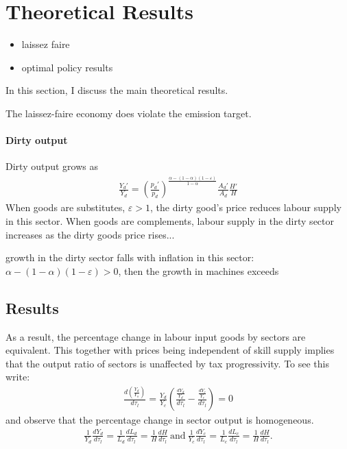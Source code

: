 \section{Theoretical Results}\label{sec:theory}
\begin{itemize}
	\item laissez faire
	\item optimal policy results
\end{itemize}

In this section, I discuss the main theoretical results. 

The laissez-faire economy does violate the emission target. 

\paragraph{Dirty output}

Dirty output grows as
\begin{align*}
	\frac{Y_d'}{Y_d}=\left(\frac{p_d'}{p_d}\right)^{\frac{\alpha-(1-\alpha)(1-\varepsilon)}{1-\alpha}}\frac{A_d'}{A_d}\frac{H'}{H}
\end{align*}
When goods are substitutes, $\varepsilon>1$, the dirty good's price reduces labour supply in this sector. When goods are complements, labour supply in the dirty sector increases as the dirty goods price rises...

growth in the dirty sector falls with inflation in this sector: $\alpha -(1-\alpha)(1-\varepsilon)>0$, then the growth in machines exceeds 
\subsection{Results}
As a result, the percentage change in labour input goods by sectors are equivalent. This together with prices being independent of skill supply implies that the output ratio of sectors is unaffected by tax progressivity.
To see this write:
\begin{align}
	\frac{d\left(\frac{Y_d}{Y_s}\right)}{d \tau_l}=\frac{Y_d}{Y_c}\left(\frac{\frac{dY_d}{Y_d}}{d \tau_l}-\frac{\frac{dY_c}{Y_c}}{d \tau_l}\right)=0
\end{align}
and observe that the percentage change in sector output is homogeneous. 
\begin{align}
	\frac{1}{Y_d}\frac{dY_d}{d \tau_l}= \frac{1}{L_d}\frac{d L_d}{d \tau_l}=\frac{1}{H}\frac{d H}{d \tau_l}\ \text{and} \ \frac{1}{Y_c}\frac{dY_c}{d \tau_l}= \frac{1}{L_c}\frac{d L_c}{d \tau_l}=\frac{1}{H}\frac{d H}{d \tau_l}.
\end{align}






